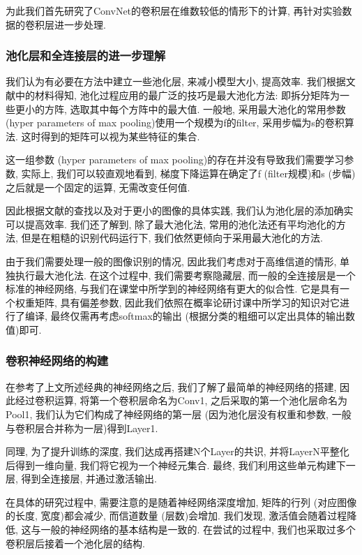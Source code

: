 \documentclass[lang=cn, 11pt,   a4paper]{elegantpaper}
\begin{document}
为此我们首先研究了ConvNet的卷积层在维数较低的情形下的计算, 再针对实验数据的卷积层进一步处理. 

\subsubsection{池化层和全连接层的进一步理解}
我们认为有必要在方法中建立一些池化层, 来减小模型大小, 提高效率. 我们根据文献中的材料得知, 池化过程应用的最广泛的技巧是最大池化方法: 即拆分矩阵为一些更小的方阵, 选取其中每个方阵中的最大值. 一般地, 采用最大池化的常用参数 (hyper parameters of max pooling)使用一个规模为f的filter, 采用步幅为s的卷积算法. 这时得到的矩阵可以视为某些特征的集合. 

这一组参数 (hyper parameters of max pooling)的存在并没有导致我们需要学习参数, 实际上, 我们可以较直观地看到, 梯度下降运算在确定了f (filter规模)和s (步幅)之后就是一个固定的运算, 无需改变任何值. 

因此根据文献的查找以及对于更小的图像的具体实践, 我们认为池化层的添加确实可以提高效率. 我们还了解到, 除了最大池化法, 常用的池化法还有平均池化的方法, 但是在粗糙的识别代码运行下, 我们依然更倾向于采用最大池化的方法. 

由于我们需要处理一般的图像识别的情况, 因此我们考虑对于高维信道的情形, 单独执行最大池化法. 在这个过程中, 我们需要考察隐藏层, 而一般的全连接层是一个标准的神经网络, 与我们在课堂中所学到的神经网络有更大的似合性. 它是具有一个权重矩阵, 具有偏差参数, 因此我们依照在概率论研讨课中所学习的知识对它进行了编译, 最终仅需再考虑softmax的输出 (根据分类的粗细可以定出具体的输出数值)即可. 

\subsubsection{卷积神经网络的构建}
在参考了上文所述经典的神经网络之后, 我们了解了最简单的神经网络的搭建, 因此经过卷积运算, 将第一个卷积层命名为Conv1, 之后采取的第一个池化层命名为Pool1, 我们认为它们构成了神经网络的第一层 (因为池化层没有权重和参数, 一般与卷积层合并称为一层)得到Layer1. 

同理, 为了提升训练的深度, 我们达成再搭建N个Layer的共识, 并将LayerN平整化后得到一维向量, 我们将它视为一个神经元集合. 最终, 我们利用这些单元构建下一层, 得到全连接层, 并通过激活输出.
 
在具体的研究过程中, 需要注意的是随着神经网络深度增加, 矩阵的行列 (对应图像的长度, 宽度)都会减少, 而信道数量 (层数)会增加. 我们发现, 激活值会随着过程降低, 这与一般的神经网络的基本结构是一致的. 在尝试的过程中, 我们也采取过多个卷积层后接着一个池化层的结构. 
\end{document}
